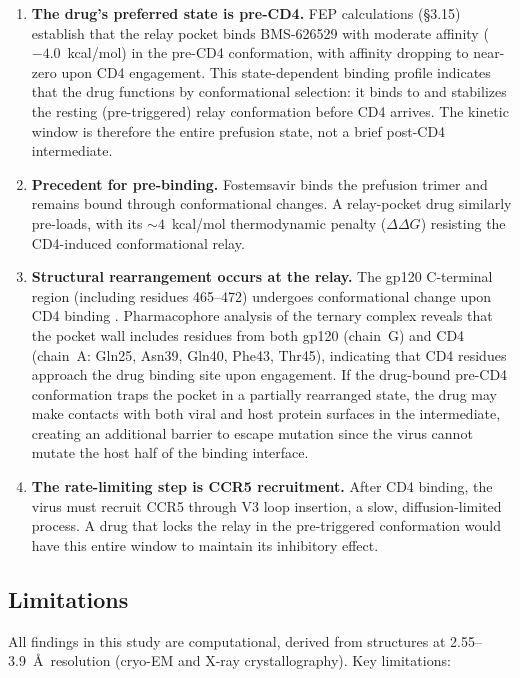 \documentclass[11pt,a4paper]{article}
\begin{document}
\begin{enumerate}[nosep,leftmargin=1.5em]
    \item \textbf{The drug's preferred state is pre-CD4.} FEP calculations (\S3.15) establish that the relay pocket binds BMS-626529 with moderate affinity ($-4.0$~kcal/mol) in the pre-CD4 conformation, with affinity dropping to near-zero upon CD4 engagement. This state-dependent binding profile indicates that the drug functions by conformational selection: it binds to and stabilizes the resting (pre-triggered) relay conformation before CD4 arrives. The kinetic window is therefore the entire prefusion state, not a brief post-CD4 intermediate.

    \item \textbf{Precedent for pre-binding.} Fostemsavir binds the prefusion trimer and remains bound through conformational changes. A relay-pocket drug similarly pre-loads, with its ${\sim}4$~kcal/mol thermodynamic penalty ($\Delta\Delta G$) resisting the CD4-induced conformational relay.

    \item \textbf{Structural rearrangement occurs at the relay.} The gp120 C-terminal region (including residues 465--472) undergoes conformational change upon CD4 binding \citep{Pancera2010,Herschhorn2016}. Pharmacophore analysis of the ternary complex reveals that the pocket wall includes residues from both gp120 (chain~G) and CD4 (chain~A: Gln25, Asn39, Gln40, Phe43, Thr45), indicating that CD4 residues approach the drug binding site upon engagement. If the drug-bound pre-CD4 conformation traps the pocket in a partially rearranged state, the drug may make contacts with both viral and host protein surfaces in the intermediate, creating an additional barrier to escape mutation since the virus cannot mutate the host half of the binding interface.

    \item \textbf{The rate-limiting step is CCR5 recruitment.} After CD4 binding, the virus must recruit CCR5 through V3 loop insertion, a slow, diffusion-limited process. A drug that locks the relay in the pre-triggered conformation would have this entire window to maintain its inhibitory effect.
\end{enumerate}

\subsection{Limitations}

All findings in this study are computational, derived from structures at 2.55--3.9~\AA\ resolution (cryo-EM and X-ray crystallography). Key limitations:
\end{document}
